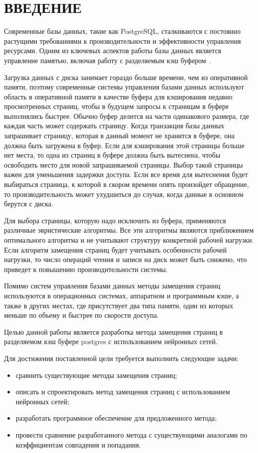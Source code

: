 \chapter*{ВВЕДЕНИЕ}

Современные базы данных, такие как PostgreSQL, сталкиваются с постоянно растущими требованиями к производительности и эффективности управления ресурсами.
Одним из ключевых аспектов работы базы данных является управление памятью, включая работу с разделяемым кэш буфером~\cite{yuan2022learned}.

Загрузка данных с диска занимает гораздо больше времени, чем из оперативной памяти, поэтому современные системы управления базами данных используют область в оперативной памяти в качестве буфера для кэширования недавно просмотренных страниц, чтобы в будущем запросы к страницам в буфере выполнялись быстрее. 
Обычно буфер делится на части одинакового размера, где каждая часть может содержать страницу. 
Когда транзакция базы данных запрашивает страницу, которая в данный момент не хранится в буфере, она должна быть загружена в буфер.
Если для кэширования этой страницы больше нет места, то одна из страниц в буфере должна быть вытеснена, чтобы освободить место для новой запрашиваемой страницы. 
Выбор такой страницы важен для уменьшения задержки доступа.
Если все время для вытеснения будет выбираться страница, к которой в скором времени опять произойдет обращение, то производительность может ухудшиться до случая, когда данные в основном берутся с диска.

Для выбора страницы, которую надо исключить из буфера, применяются различные эвристические алгоритмы.
Все эти алгоритмы являются приближением оптимального алгоритма и не учитывают структуру конкретной рабочей нагрузки.
Если алгоритм замещения страниц будет учитывать особенности рабочей нагрузки, то число операций чтения и записи на диск может быть снижено, что приведет к повышению производительности системы.

Помимо систем управления базами данных методы замещения страниц используются в операционных системах, аппаратном и программным кэше, а также в других местах, где присутствует два типа памяти, один из которых меньше по объему и быстрее по скорости доступа.

Целью данной работы является разработка метода замещения страниц в разделяемом кэш буфере postgres с использованием нейронных сетей.

Для достижения поставленной цели требуется выполнить следующие задачи:
\begin{itemize}
	\item сравнить существующие методы замещения страниц;
	\item описать и спроектировать метод замещения страниц с использованием нейронных сетей;
	\item разработать программное обеспечение для предложенного метода;
	\item провести сравнение разработанного метода с существующими аналогами по коэффициентам совпадения и попадания.
\end{itemize}